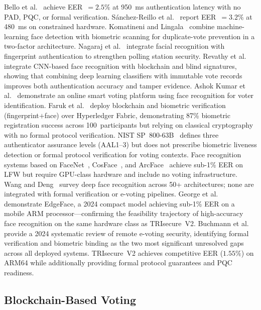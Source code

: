 \documentclass[conference]{IEEEtran}
\begin{document}
Bello et al.~\cite{bello2021biometric} achieve EER~\(=2.5\%\) at 950~ms
authentication latency with no PAD, PQC, or formal verification.
Sánchez-Reillo et al.~\cite{sanchez2020biometric} report EER~\(=3.2\%\)
at 480~ms on constrained hardware.
Komatineni and Lingala~\cite{komatineni2020biometric} combine
machine-learning face detection with biometric scanning for duplicate-vote
prevention in a two-factor architecture.
Nagaraj et al.~\cite{nagaraj2022voting} integrate facial recognition with
fingerprint authentication to strengthen polling station security.
Revathy et al.~\cite{revathy2022cnn_evoting} integrate CNN-based face
recognition with blockchain and blind signatures, showing that combining
deep learning classifiers with immutable vote records improves both
authentication accuracy and tamper evidence.
Ashok Kumar et al.~\cite{ashokkumar2023smart} demonstrate an online smart
voting platform using face recognition for voter identification.
Faruk et al.~\cite{faruk2024transforming} deploy blockchain and biometric
verification (fingerprint\(+\)face) over Hyperledger Fabric, demonstrating
87\% biometric registration success across 100~participants but relying on
classical cryptography with no formal protocol verification.
NIST SP~800-63B~\cite{nist_sp800_63b} defines three authenticator assurance
levels (AAL1–3) but does not prescribe biometric liveness detection or
formal protocol verification for voting contexts.
Face recognition systems based on FaceNet~\cite{schroff2015facenet},
CosFace~\cite{wang2018cosface}, and ArcFace~\cite{deng2019arcface} achieve
sub-1\% EER on LFW but require GPU-class hardware and include no voting
infrastructure. Wang and Deng~\cite{wang2021face} survey deep face recognition
across 50+ architectures; none are integrated with formal verification or
e-voting pipelines. George et al.~\cite{george2024adaptive_biometric}
demonstrate EdgeFace, a 2024 compact model achieving sub-1\% EER on a
mobile ARM processor—confirming the feasibility trajectory of high-accuracy
face recognition on the same hardware class as TRIsecure~V2.
Buchmann et al.~\cite{buchmann2024pvoting} provide a 2024 systematic review
of remote e-voting security, identifying formal verification and biometric
binding as the two most significant unresolved gaps across all deployed systems.
TRIsecure~V2 achieves competitive EER (\(1.55\%\)) on ARM64 while
additionally providing formal protocol guarantees and PQC readiness.

\subsection{Blockchain-Based Voting}
\end{document}
